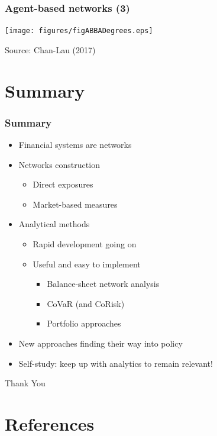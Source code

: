 \documentclass[aspectratio=43,dvipsnames,usenames, svgnames]{beamer}
\begin{document}
\begin{frame} %
\begin{center}
\frametitle{Agent-based networks (3)}
	\texttt{[image: figures/figABBADegrees.eps]}
\end{center}
\tiny{Source: Chan-Lau (2017)}
\end{frame}

\section{Summary}

\begin{frame} %
\frametitle{Summary}
\begin{itemize}
	\item Financial systems are networks
	\smallskip
	\item Networks construction
	\begin{itemize}
		\item Direct exposures
		\item Market-based measures
	\end{itemize}
	\smallskip
	\item Analytical methods
	\begin{itemize}
		\item Rapid development going on
		\item Useful and easy to implement
			\begin{itemize}
				\item Balance-sheet network analysis
				\item CoVaR (and CoRisk)
				\item Portfolio approaches
			\end{itemize}
	\end{itemize}
	\smallskip
	\item New approaches finding their way into policy
	\smallskip
	\item Self-study: keep up with analytics to remain relevant!
\end{itemize}
\end{frame}

\begin{frame} %
	\centering
	\Huge{Thank You}
\end{frame}

\section*{References}
\end{document}
